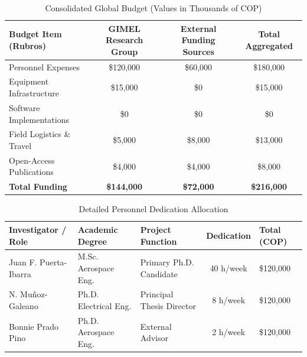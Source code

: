 \documentclass[11pt,letterpaper]{article}
\begin{document}
\begin{table}[h!]
\caption{Consolidated Global Budget (Values in Thousands of COP)}
\label{tab:budget}
\centering
\begin{tabularx}{\textwidth}{Lccc}
\hline
\textbf{Budget Item (Rubros)} & \textbf{GIMEL Research Group} & \textbf{External Funding Sources} & \textbf{Total Aggregated} \\ \hline
Personnel Expenses            & \$120,000                     & \$60,000                          & \$180,000                 \\
Equipment Infrastructure      & \$15,000                      & \$0                               & \$15,000                  \\
Software Implementations       & \$0                           & \$0                               & \$0                       \\
Field Logistics \& Travel     & \$5,000                       & \$8,000                           & \$13,000                  \\
Open-Access Publications      & \$4,000                       & \$4,000                           & \$8,000                   \\ \hline
\textbf{Total Funding}        & \textbf{\$144,000}            & \textbf{\$72,000}                 & \textbf{\$216,000}        \\ \hline
\end{tabularx}
\end{table}

\begin{table}[h!]
\caption{Detailed Personnel Dedication Allocation}
\label{tab:personnel}
\centering
\small
\begin{tabularx}{\textwidth}{lLLcY}
\hline
\textbf{Investigator / Role} & \textbf{Academic Degree} & \textbf{Project Function} & \textbf{Dedication} & \textbf{Total (COP)} \\ \hline
Juan F. Puerta-Ibarra     & M.Sc. Aerospace Eng.     & Primary Ph.D. Candidate   & 40 h/week           & \$120,000         \\
N. Muñoz-Galeano          & Ph.D. Electrical Eng.    & Principal Thesis Director & 8 h/week            & \$120,000          \\
Bonnie Prado Pino         & Ph.D. Aerospace Eng.     & External Advisor          & 2 h/week            & \$120,000          \\ \hline
\end{tabularx}
\end{table}
\end{document}
